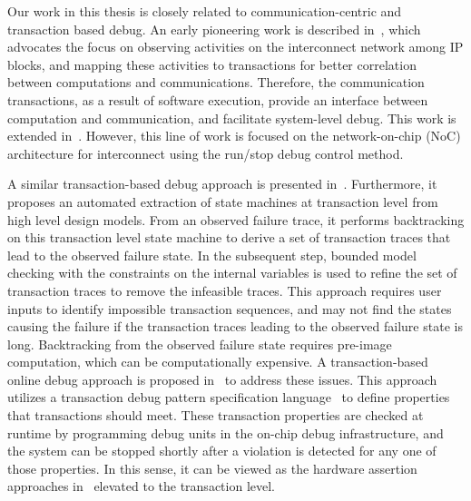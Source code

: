 \documentclass[12pt,frontmatter,copyright,thesis]{usfmanus}
\begin{document}
Our work in this thesis is closely related to communication-centric and
transaction based debug.  An early pioneering work is
described in~\cite{Goossens2007NOCS}, which advocates the
focus on observing activities on the interconnect network
among IP blocks, and mapping these activities to
transactions for better correlation between computations and
communications.  Therefore, the communication transactions,
as a result of software execution, provide an interface
between computation and communication, and facilitate
system-level debug.  This work is extended
in~\cite{Vermeulen2009VLSI-DAT,Goossens2009DATE}.  However,
this line of work is focused on the network-on-chip (NoC)
architecture for interconnect using the run/stop debug
control method.

A similar transaction-based debug approach is presented
in~\cite{Gharehbaghi2012ISQED}.  Furthermore, it proposes an
automated extraction of state machines at transaction level
from high level design models.  From an observed failure
trace, it performs backtracking on this transaction level
state machine to derive a set of transaction traces that
lead to the observed failure state.  In the subsequent step,
bounded model checking with the constraints on the internal
variables is used to refine the set of transaction traces to
remove the infeasible traces.  This approach requires user
inputs to identify impossible transaction sequences, and may
not find the states causing the failure if the transaction
traces leading to the observed failure state is long.
Backtracking from the observed failure state requires
pre-image computation, which can be computationally
expensive.  A transaction-based online debug approach is
proposed in~\cite{Dehbash2014} to address these issues.
This approach utilizes a transaction debug pattern
specification language~\cite{Gharehbaghi2009ICCD} to define
properties that transactions should meet.  These transaction
properties are checked at runtime by programming debug units
in the on-chip debug infrastructure, and the system can be
stopped shortly after a violation is detected for any one of
those properties.  In this sense, it can be viewed as the
hardware assertion approaches in~\cite{Boule2007ISQED}
elevated to the transaction level.
\end{document}
